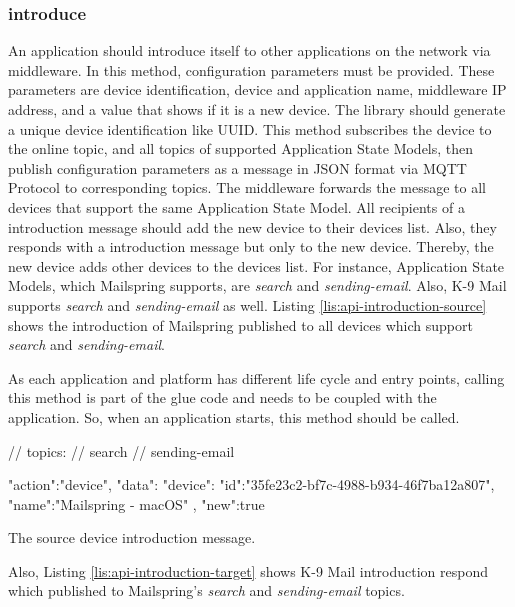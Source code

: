 \subsubsection{introduce}
An application should introduce itself to other applications on the network via middleware. In this method, configuration parameters must be provided. These parameters are device identification, device and application name, middleware IP address, and a value that shows if it is a new device. The library should generate a unique device identification like UUID. This method subscribes the device to the online topic, and all topics of supported Application State Models, then publish configuration parameters as a message in JSON format via MQTT Protocol to corresponding topics. The middleware forwards the message to all devices that support the same Application State Model. All recipients of a introduction message should add the new device to their devices list. Also, they responds with a introduction message but only to the new device. Thereby, the new device adds other devices to the devices list. For instance, Application State Models, which Mailspring supports, are \textit{search} and \textit{sending-email}. Also, K-9 Mail supports \textit{search} and \textit{sending-email} as well. Listing \ref{lis:api-introduction-source} shows the introduction of Mailspring published to all devices which support \textit{search} and \textit{sending-email}.

As each application and platform has different life cycle and entry points, calling this method is part of the glue code and needs to be coupled with the application. So, when an application starts, this method should be called.

\FloatBarrier
\begin{code}
\begin{js2}
// topics:
// search
// sending-email
\end{js2}
\begin{json}
{
   "action":"device",
   "data":{
      "device":{
         "id":"35fe23c2-bf7c-4988-b934-46f7ba12a807",
         "name":"Mailspring - macOS"
      },
      "new":true
   }
}
\end{json}
\caption{The source device introduction message.}
\label{lis:api-introduction-source}
\end{code}
\FloatBarrier


Also, Listing \ref{lis:api-introduction-target} shows K-9 Mail introduction respond which  published to Mailspring's \textit{search} and \textit{sending-email} topics.

